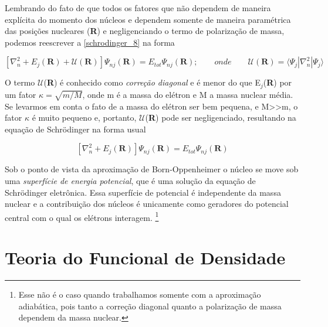 	Lembrando do fato de que todos os fatores que não dependem de maneira explícita do momento dos núcleos e dependem somente de maneira paramétrica das posições nucleares (\textbf{R}) e negligenciando o termo de polarização de massa, podemos reescrever a \autoref{schrodinger_8} na forma
	
	\begin{equation}
	\label{schrodinger_9}
	\left[ \nabla_n^2 + E_j(\textbf{R}) + \mathcal{U}\left(\textbf{R}\right) \right] \Psi_{nj}(\textbf{R}) = E_{tot}\Psi_{nj}(\textbf{R}); \qquad onde \qquad \mathcal{U} \left( \textbf{R} \right) = \langle \Psi_j|\nabla_n^2|\Psi_j\rangle
	\end{equation}
	
	O termo $\mathcal{U}$(\textbf{R}) é conhecido como \textit{correção diagonal} e é menor do que E$_{j}$(\textbf{R}) por um fator $\kappa = \sqrt{m/M}$, onde m é a massa do elétron e M a massa nuclear média. Se levarmos em conta o fato de a massa do elétron ser bem pequena, e M>>m, o fator $\kappa$ é muito pequeno e, portanto, $\mathcal{U}$(\textbf{R}) pode ser negligenciado, resultando na equação de Schrödinger na forma usual
	
	\begin{equation}
	\label{schrodinger_10}
	\left[ \nabla_n^2 + E_j(\textbf{R})\right]\Psi_{nj}(\textbf{R}) = E_{tot}\Psi_{nj}(\textbf{R})
	\end{equation}
	
	Sob o ponto de vista da aproximação de Born-Oppenheimer o núcleo se move sob uma \textit{superfície de energia potencial}, que é uma solução da equação de Schrödinger eletrônica. Essa superfície de potencial é independente da massa nuclear e a contribuição dos núcleos é unicamente como geradores do potencial central com o qual os elétrons interagem. \footnote{Esse não é o caso quando trabalhamos somente com a aproximação adiabática, pois tanto a correção diagonal quanto a polarização de massa dependem da massa nuclear.}
	

	
\section{Teoria do Funcional de Densidade}
		
